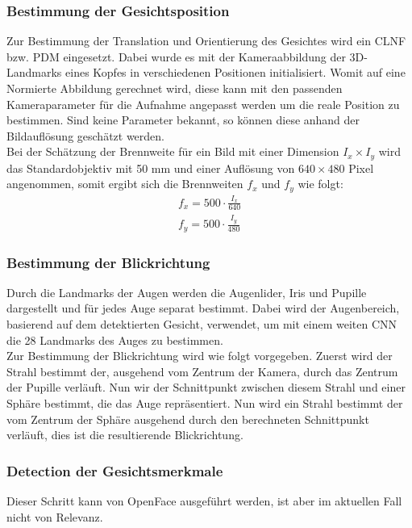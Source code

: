 \subsubsection{Bestimmung der Gesichtsposition}
Zur Bestimmung der Translation und Orientierung des Gesichtes wird ein CLNF bzw. PDM eingesetzt. Dabei wurde es mit der Kameraabbildung der 3D-Landmarks eines Kopfes in verschiedenen Positionen initialisiert. Womit auf eine Normierte Abbildung gerechnet wird, diese kann mit den passenden Kameraparameter für die Aufnahme angepasst werden um die reale Position zu bestimmen. Sind keine Parameter bekannt, so können diese anhand der Bildauflösung geschätzt werden.\\
Bei der Schätzung der Brennweite für ein Bild mit einer Dimension $I_x\times I_y$ wird das Standardobjektiv mit 50 mm und einer Auflösung von $640 \times 480$ Pixel angenommen, somit ergibt sich die Brennweiten $f_x$ und $f_y$ wie folgt:
\begin{align*}
f_x = 500\cdot \frac{I_x}{640}\\
f_y = 500\cdot \frac{I_y}{480}
\end{align*}
\subsubsection{Bestimmung der Blickrichtung}
Durch die Landmarks der Augen werden die Augenlider, Iris und Pupille dargestellt und für jedes Auge separat bestimmt. Dabei wird der Augenbereich, basierend auf dem detektierten Gesicht, verwendet, um mit einem weiten CNN die 28 Landmarks des Auges zu bestimmen.\\
Zur Bestimmung der Blickrichtung wird wie folgt vorgegeben. Zuerst wird der Strahl bestimmt der, ausgehend vom Zentrum der Kamera, durch das Zentrum der Pupille verläuft. Nun wir der Schnittpunkt zwischen diesem Strahl und einer Sphäre bestimmt, die das Auge repräsentiert. Nun wird ein Strahl bestimmt der vom Zentrum der Sphäre ausgehend durch den berechneten Schnittpunkt verläuft, dies ist die resultierende Blickrichtung.
\subsubsection{Detection der Gesichtsmerkmale}
Dieser Schritt kann von OpenFace ausgeführt werden, ist aber  im aktuellen Fall nicht von Relevanz.
